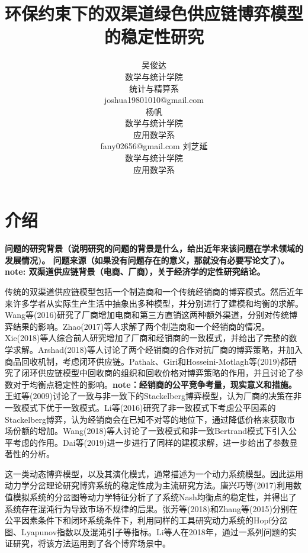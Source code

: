 \documentclass{article}
\title{环保约束下的双渠道绿色供应链博弈模型的稳定性研究}
\author{
    吴俊达\\数学与统计学院\\统计与精算系\\joshua19801010@gmail.com\\
    \And
    杨帆\\数学与统计学院\\应用数学系\\fany02656@gmail.com
    \And
    刘芝延\\数学与统计学院\\应用数学系\\
}
\begin{document}
\maketitle
\begin{abstract}

\end{abstract}
\keywords{}
\section{介绍}
\par \textbf{
    问题的研究背景（说明研究的问题的背景是什么，给出近年来该问题在学术领域的发展情况)。
    问题来源（如果没有问题存在的意义，那就没有必要写论文了)。
    note: 双渠道供应链背景（电商、厂商），关于经济学的定性研究结论。
}
\par 传统的双渠道供应链模型包括一个制造商和一个传统经销商的博弈模式。然后近年来许多学者从实际生产生活中抽象出多种模型，并分别进行了建模和均衡的求解。Wang等(2016)\cite{2016Wang}研究了厂商增加电商和第三方直销这两种额外渠道，分别对传统博弈结果的影响。Zhao(2017)\cite{2017Zhao}等人求解了两个制造商和一个经销商的情况。Xie(2018)\cite{2018Xie}等人综合前人研究增加了厂商和经销商的一致模式，并给出了完整的数学求解。Arshad(2018)\cite{2018Arshad}等人讨论了两个经销商的合作对抗厂商的博弈策略，并加入商品回收机制，考虑闭环供应链。Pathak、Giri和Hosseini-Motlagh等(2019)\cite{2019Pathak}\cite{2019Giri,2019Hosseini-Motlagh}都研究了闭环供应链模型中回收商的组织和回收价格对博弈策略的作用，并且讨论了参数对于均衡点稳定性的影响。\textbf{note：经销商的公平竞争考量，现实意义和措施。}王虹等(2009)\cite{2009Wang}讨论了一致与非一致下的Stackelberg博弈模型，认为厂商的决策在非一致模式下优于一致模式。Li等(2016)\cite{2016Li}研究了非一致模式下考虑公平因素的Stackelberg博弈，认为经销商会在已知不对等的地位下，通过降低价格来获取市场份额的增加。Wang(2018)\cite{2018Wang}等人讨论了一致模式和非一致Bertrand模式下引入公平考虑的作用。Dai等(2019)\cite{2019Dai}进一步进行了同样的建模求解，进一步给出了参数显著性的分析。
\par 这一类动态博弈模型，以及其演化模式，通常描述为一个动力系统模型。因此运用动力学分岔理论研究博弈系统的稳定性成为主流研究方法。唐兴巧等(2017)\cite{2017Tang}利用数值模拟系统的分岔图等动力学特征分析了了系统Nash均衡点的稳定性，并得出了系统存在混沌行为导致市场不规律的后果。张芳等(2018)\cite{2018Zhang}和Zhang等(2015)\cite{2015Zhang}分别在公平因素条件下和闭环系统条件下，利用同样的工具研究动力系统的Hopf分岔图、Lyapunov指数以及混沌引子等指标。Li等人在2018年，通过一系列问题的实证研究，将该方法运用到了各个博弈场景中\cite{2018Huang,2018Qiu-Xiang,2019Qiu-Xiang1,2019Qiu-Xiang2}。
\end{document}
